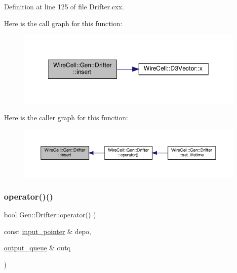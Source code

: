 Definition at line 125 of file Drifter.\+cxx.

Here is the call graph for this function\+:
\nopagebreak
\begin{figure}[H]
\begin{center}
\leavevmode
\includegraphics[width=340pt]{class_wire_cell_1_1_gen_1_1_drifter_a29fcb959e2873e8887595566a12dba7c_cgraph}
\end{center}
\end{figure}
Here is the caller graph for this function\+:
\nopagebreak
\begin{figure}[H]
\begin{center}
\leavevmode
\includegraphics[width=350pt]{class_wire_cell_1_1_gen_1_1_drifter_a29fcb959e2873e8887595566a12dba7c_icgraph}
\end{center}
\end{figure}
\mbox{\label{class_wire_cell_1_1_gen_1_1_drifter_aaac2664d52bd3ea47308e2760b256dab}} 
\subsubsection{\texorpdfstring{operator()()}{operator()()}}
{\footnotesize\ttfamily bool Gen\+::\+Drifter\+::operator() (\begin{DoxyParamCaption}\item[{const \hyperlink{class_wire_cell_1_1_i_queuedout_node_acf5f716a764553f3c7055a9cf67e906e}{input\+\_\+pointer} \&}]{depo,  }\item[{\hyperlink{class_wire_cell_1_1_i_queuedout_node_a39018e4e3dd886befac9636ac791a685}{output\+\_\+queue} \&}]{outq }\end{DoxyParamCaption})\hspace{0.3cm}{\ttfamily [virtual]}}



